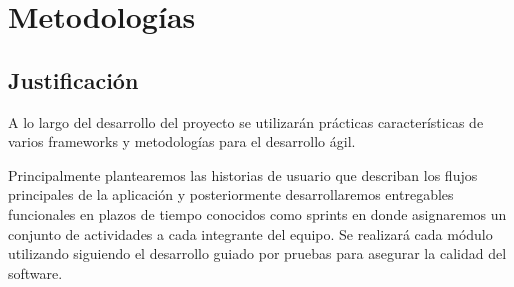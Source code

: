 \clearpage
\chapter{Metodologías}
\section{Justificación}
A lo largo del desarrollo del proyecto se utilizarán prácticas características de varios frameworks y metodologías para el desarrollo ágil.

Principalmente plantearemos las historias de usuario que describan los flujos principales de la aplicación y posteriormente desarrollaremos entregables funcionales en plazos de tiempo conocidos como sprints en donde asignaremos un conjunto de actividades a cada integrante del equipo. Se realizará cada módulo utilizando siguiendo el desarrollo guiado por pruebas para asegurar la calidad del software. 


